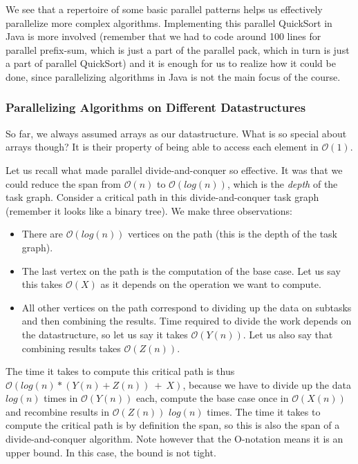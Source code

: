 \documentclass[main.tex]{subfiles}
\begin{document}
We see that a repertoire of some basic parallel patterns helps us effectively parallelize more complex algorithms. Implementing this parallel QuickSort in Java is more involved (remember that we had to code around 100 lines for parallel prefix-sum, which is just a part of the parallel pack, which in turn is just a part of parallel QuickSort) and it is enough for us to realize how it could be done, since parallelizing algorithms in Java is not the main focus of the course.

\subsubsection{Parallelizing Algorithms on Different Datastructures}
So far, we always assumed arrays as our datastructure. What is so special about arrays though? It is their property of being able to access each element in \(\mathcal{O}(1)\).

Let us recall what made parallel divide-and-conquer so effective. It was that we could reduce the span from \(\mathcal{O}(n)\) to \(\mathcal{O}\left(log(n)\right)\), which is the \textit{depth} of the task graph. Consider a critical path in this divide-and-conquer task graph (remember it looks like a binary tree). We make three observations:

\begin{itemize}
  \item There are \(\mathcal{O}\left(log(n)\right)\) vertices on the path (this is the depth of the task graph).
  \item The last vertex on the path is the computation of the base case. Let us say this takes \(\mathcal{O}(X)\) as it depends on the operation we want to compute.
  \item All other vertices on the path correspond to dividing up the data on subtasks and then combining the results. Time required to divide the work depends on the datastructure, so let us say it takes \(\mathcal{O}(Y(n))\). Let us also say that combining results takes \(\mathcal{O}(Z(n))\).
\end{itemize}

\noindent The time it takes to compute this critical path is thus \(\mathcal{O}\left(log(n)*(Y(n) + Z(n))\ +\ X\right)\), because we have to divide up the data \(log(n)\) times in \(\mathcal{O}(Y(n))\) each, compute the base case once in \(\mathcal{O}(X(n))\) and recombine results in \(\mathcal{O}(Z(n))\) \(log(n)\) times. The time it takes to compute the critical path is by definition the span, so this is also the span of a divide-and-conquer algorithm. Note however that the O-notation means it is an upper bound. In this case, the bound is not tight.
\end{document}
